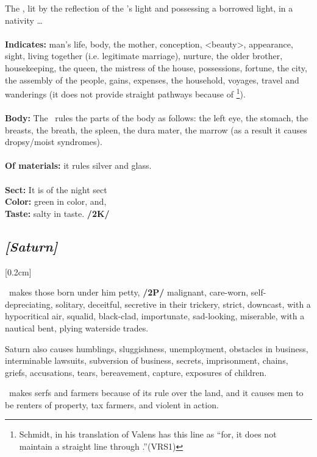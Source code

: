 The \Moon, lit by the reflection of the \Sun’s light and possessing a borrowed light, in a nativity \ldots \\
\\
\textbf{Indicates:} man’s life, body, the mother, conception, <beauty>, appearance, sight, living together (i.e. legitimate marriage), nurture, the older brother, housekeeping, the queen, the mistress of the house, possessions, fortune, the city, the assembly of the people, gains, expenses, the household, voyages, travel and wanderings (it does not provide straight pathways because of \Cancer
\footnote{Schmidt, in his translation of Valens has this line as ``for, it does not maintain a straight line through \Cancer.''(VRS1)}). \\
\\
\textbf{Body:} The \Moon\, rules the parts of the body as follows: the left eye, the stomach, the breasts, the breath, the spleen, the dura mater, the marrow (as a result it causes dropsy/moist syndromes). \\
\\
\textbf{Of materials:} it rules silver and glass. \\
\\
\textbf{Sect:} It is of the night sect \\
\textbf{Color:} green in color, and, \\
\textbf{Taste:} salty in taste. \textbf{/2K/}
\secbr
\subsection{\textit{[Saturn]}}
[0.2cm]

\Saturn\, makes those born under him petty, \textbf{/2P/} malignant, care-worn, self-depreciating, solitary, deceitful, secretive in their trickery, strict, downcast, with a hypocritical air, squalid, black-clad, importunate, sad-looking, miserable, with a nautical bent, plying waterside trades. 

Saturn also causes humblings, sluggishness, unemployment, obstacles in business, interminable lawsuits, subversion of business, secrets, imprisonment, chains, griefs, accusations, tears, bereavement, capture, exposures of children. 

\Saturn\, makes serfs and farmers because of its rule over the land, and it causes men to be renters of property, tax farmers, and violent in action. 

